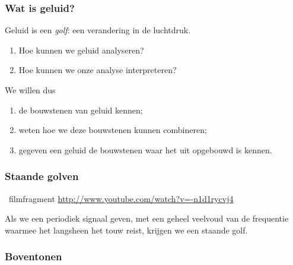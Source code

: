 \documentclass[compress, darktitle, framenumber, totalframenumber]{beamer}
\begin{document}
\begin{frame}
  \frametitle{Wat is geluid?}

  Geluid is een \emph{golf}: een verandering in de luchtdruk.
  \pause
  \begin{enumerate}
    \item Hoe kunnen we geluid analyseren?
    \item Hoe kunnen we onze analyse interpreteren?
  \end{enumerate}
  \pause
  We willen dus
  \begin{enumerate}
    \item de bouwstenen van geluid kennen;
    \item weten hoe we deze bouwstenen kunnen combineren;
    \item gegeven een geluid de bouwstenen waar het uit opgebouwd is kennen.
  \end{enumerate}
\end{frame}

\begin{frame}
  \frametitle{Staande golven}

  \begin{block}{\Forward\ filmfragment}
    \url{http://www.youtube.com/watch?v=-n1d1rycvj4}
  \end{block}

  \pause

  Als we een periodiek signaal geven, met een geheel veelvoud van de frequentie waarmee het langsheen het touw reist, krijgen we een \alert{staande golf}.
\end{frame}

\begin{frame}
  \frametitle{Boventonen}

  \centering
\end{frame}
\end{document}
